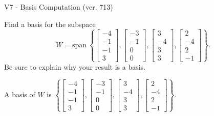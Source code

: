 \begin{exercise}
  \begin{exerciseTitle}V7 - Basis Computation (ver. 713)\end{exerciseTitle}
  \begin{exerciseStatement}
    Find a basis for the subspace 
\[W=\mathrm{span}\ \left\{\left[\begin{array}{r}
-4 \\
-1 \\
-1 \\
3
\end{array}\right] , \left[\begin{array}{r}
-3 \\
-1 \\
0 \\
0
\end{array}\right] , \left[\begin{array}{r}
3 \\
-4 \\
3 \\
3
\end{array}\right] , \left[\begin{array}{r}
2 \\
-4 \\
2 \\
-1
\end{array}\right]\right\}.\]
 Be sure to explain why your result is a basis.


  \end{exerciseStatement}
  \begin{exerciseAnswer}
   A basis of \(W\) is  \(\left\{\left[\begin{array}{r}
-4 \\
-1 \\
-1 \\
3
\end{array}\right] , \left[\begin{array}{r}
-3 \\
-1 \\
0 \\
0
\end{array}\right] , \left[\begin{array}{r}
3 \\
-4 \\
3 \\
3
\end{array}\right] , \left[\begin{array}{r}
2 \\
-4 \\
2 \\
-1
\end{array}\right]\right\}\).
  


  \end{exerciseAnswer}
\end{exercise}